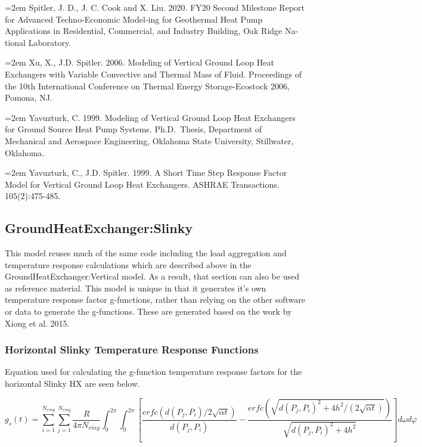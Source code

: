 \hangindent=2em
\noindent Spitler, J. D., J. C. Cook and X. Liu. 2020. FY20 Second Milestone Report for Advanced Techno-Economic Model-ing for Geothermal Heat Pump Applications in Residential, Commercial, and Industry Building, Oak Ridge Na-tional Laboratory.

\hangindent=2em
\noindent Xu, X., J.D. Spitler. 2006. Modeling of Vertical Ground Loop Heat Exchangers with Variable Convective and Thermal Mass of Fluid. Proceedings of the 10th International Conference on Thermal Energy Storage-Ecostock 2006, Pomona, NJ.

\hangindent=2em
\noindent Yavuzturk, C. 1999. Modeling of Vertical Ground Loop Heat Exchangers for Ground Source Heat Pump Systems. Ph.D.~Thesis, Department of Mechanical and Aerospace Engineering, Oklahoma State University, Stillwater, Oklahoma.

\hangindent=2em
\noindent Yavuzturk, C., J.D. Spitler. 1999. A Short Time Step Response Factor Model for Vertical Ground Loop Heat Exchangers. ASHRAE Transactions. 105(2):475-485.

\subsection{GroundHeatExchanger:Slinky}\label{groundheatexchangerslinky}

This model reuses much of the same code including the load aggregation and temperature response calculations which are described above in the GroundHeatExchanger:Vertical model. As a result, that section can also be used as reference material. This model is unique in that it generates it's own temperature response factor g-functions, rather than relying on the other software or data to generate the g-functions. These are generated based on the work by Xiong et al. 2015.

\subsubsection{Horizontal Slinky Temperature Response Functions}\label{horizontal-slinky-temperature-response-functions}

Equation used for calculating the g-function temperature response factors for the horizontal Slinky HX are seen below.

{\scriptsize
\begin{equation}
g_s\left(t\right) = \sum_{i = 1}^{N_{ring}} \sum_{j = 1}^{N_{ring}} \frac{R}{4\pi N_{ring}} \int_0^{2\pi} \int_0^{2\pi}
            \left[
                \frac{erfc\left(d\left(P_j,P_i\right)/2\sqrt{\alpha t}\right)}{d\left(P_j,P_i\right)} -
                \frac{erfc\left(\sqrt{d\left(P_j,P_i\right)^2+4h^2/\left(2\sqrt{\alpha t}\right)}\right)}{\sqrt{d\left(P_j,P_i\right)^2+4h^2} }
            \right]d\omega d\varphi
\end{equation}}


